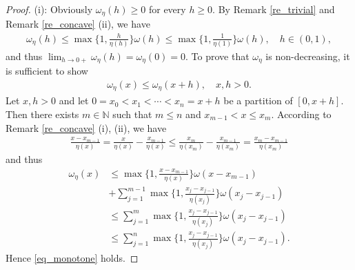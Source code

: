 \documentclass[10pt,a4paper]{amsart}
\theoremstyle{definition}
\newcommand{\N}{\mathbb{N}}
\begin{document}
\begin{proof}
(i): Obviously $ \omega_{\eta}(h)\geq 0 $ for every $ h\geq 0 $. By Remark \ref{re_trivial} and Remark \ref{re_concave} (ii), we have
\begin{align*}
\omega_{\eta}(h)\leq\max\bigg\lbrace 1,\frac{h}{\eta(h)}\bigg\rbrace\omega(h)\leq\max\bigg\lbrace 1,\frac{1}{\eta(1)}\bigg\rbrace\omega(h), \quad h\in(0,1),
\end{align*}
and thus $ \lim_{h\to 0+}\omega_{\eta}(h)=\omega_{\eta}(0)=0 $. To prove that $ \omega_{\eta} $ is non-decreasing, it is sufficient to show
\begin{align}\label{eq_monotone}
\omega_{\eta}(x)\leq\omega_{\eta}(x+h),\quad x,h>0.
\end{align}
Let $ x,h>0 $ and let $ 0=x_0<x_1<\cdots<x_n=x+h $ be a partition of $ [0,x+h] $. Then there exists $ m\in\N $ such that $ m\leq n $ and $ x_{m-1}<x\leq x_m $. According to Remark \ref{re_concave} (i), (ii), we have
\begin{align*}
\frac{x-x_{m-1}}{\eta(x)}=\frac{x}{\eta(x)}-\frac{x_{m-1}}{\eta(x)}\leq\frac{x_m}{\eta(x_m)}-\frac{x_{m-1}}{\eta(x_m)}=\frac{x_m-x_{m-1}}{\eta(x_m)}
\end{align*}
and thus
\begin{align*}
\omega_{\eta}(x)&\leq\max\bigg\lbrace 1,\frac{x-x_{m-1}}{\eta(x)}\bigg\rbrace\omega(x-x_{m-1})\\
&+\sum_{j=1}^{m-1}\max\bigg\lbrace 1,\frac{x_j-x_{j-1}}{\eta(x_j)}\bigg\rbrace\omega(x_j-x_{j-1})\\
&\leq\sum_{j=1}^{m}\max\bigg\lbrace 1,\frac{x_j-x_{j-1}}{\eta(x_j)}\bigg\rbrace\omega(x_j-x_{j-1})\\
&\leq\sum_{j=1}^{n}\max\bigg\lbrace 1,\frac{x_j-x_{j-1}}{\eta(x_j)}\bigg\rbrace\omega(x_j-x_{j-1}).
\end{align*}
Hence \eqref{eq_monotone} holds.


\end{proof}
\end{document}
